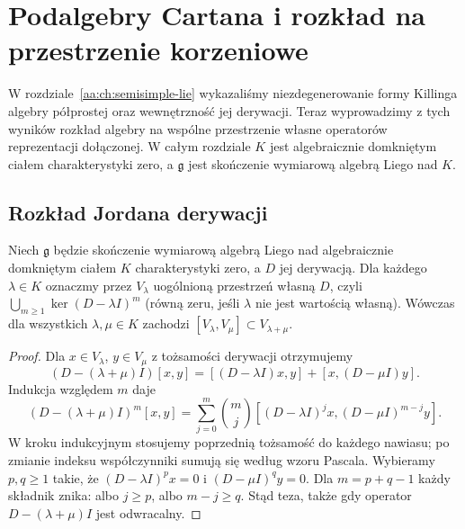 \chapter[Podalgebry Cartana]{Podalgebry Cartana i rozkład na przestrzenie korzeniowe}
\label{aa:ch:cartan-root-decomposition}

W rozdziale~\ref{aa:ch:semisimple-lie} wykazaliśmy niezdegenerowanie formy Killinga algebry półprostej oraz wewnętrzność jej derywacji. Teraz wyprowadzimy z tych wyników rozkład algebry na wspólne przestrzenie własne operatorów reprezentacji dołączonej. W całym rozdziale $K$ jest algebraicznie domkniętym ciałem charakterystyki zero, a $\mathfrak g$ jest skończenie wymiarową algebrą Liego nad $K$.

\section{Rozkład Jordana derywacji}

\begin{lemat}
\label{aa:lem:derivation-generalized-weights}
Niech $\mathfrak g$ będzie skończenie wymiarową algebrą Liego nad algebraicznie domkniętym ciałem $K$ charakterystyki zero, a $D$ jej derywacją. Dla każdego $\lambda\in K$ oznaczmy przez $V_\lambda$ uogólnioną przestrzeń własną $D$, czyli $\bigcup_{m\ge1}\ker(D-\lambda I)^m$ (równą zeru, jeśli $\lambda$ nie jest wartością własną). Wówczas dla wszystkich $\lambda,\mu\in K$ zachodzi $[V_\lambda,V_\mu]\subset V_{\lambda+\mu}$.
\end{lemat}
\begin{proof}
Dla $x\in V_\lambda$, $y\in V_\mu$ z tożsamości derywacji otrzymujemy
\[
 (D-(\lambda+\mu)I)[x,y]=
 [(D-\lambda I)x,y]+[x,(D-\mu I)y].
\]
Indukcja względem $m$ daje
\[
 (D-(\lambda+\mu)I)^m[x,y]=
 \sum_{j=0}^m\binom mj[(D-\lambda I)^jx,(D-\mu I)^{m-j}y].
\]
W kroku indukcyjnym stosujemy poprzednią tożsamość do każdego nawiasu; po zmianie indeksu współczynniki sumują się według wzoru Pascala. Wybieramy $p,q\ge1$ takie, że $(D-\lambda I)^px=0$ i $(D-\mu I)^qy=0$. Dla $m=p+q-1$ każdy składnik znika: albo $j\ge p$, albo $m-j\ge q$. Stąd teza, także gdy operator $D-(\lambda+\mu)I$ jest odwracalny.
\end{proof}

